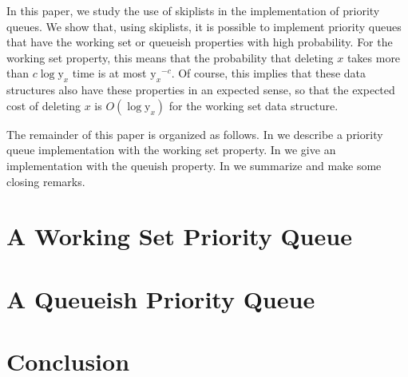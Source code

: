 \documentclass{article}
\newcommand{\y}{\mathrm{y}}
\begin{document}
In this paper, we study the use of skiplists \cite{p90} in the
implementation of priority queues.  We show that, using skiplists, it
is possible to implement priority queues that have the working set or
queueish properties with high probability.  For the working set
property, this means that the probability that deleting $x$ takes more
than $c\log \y_x$ time is at most $\y_x{}^{-c}$.  Of course, this
implies that these data structures also have these properties in an
expected sense, so that the expected cost of deleting $x$ is $O(\log
\y_x)$ for the working set data structure.

The remainder of this paper is organized as follows. In
 we describe a priority queue implementation with
the working set property.  In  we give an
implementation with the queuish property.  In  we
summarize and make some closing remarks.

\section{A Working Set Priority Queue}

\section{A Queueish Priority Queue}

\section{Conclusion}




\end{document}
